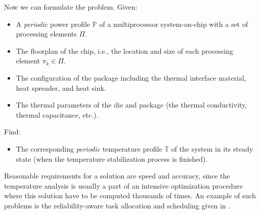 Now we can formulate the problem. Given:
\begin{itemize}
  \item A \emph{periodic} power profile $\mathbb{P}$ of a multiprocessor system-on-chip with a set of processing elements $\Pi$.
  \item The floorplan of the chip, i.e., the location and size of each processing element $\pi_k \in \Pi$.
  \item The configuration of the package including the thermal interface material, heat spreader, and heat sink.
  \item The thermal parameters of the die and package (the thermal conductivity, thermal capacitance, etc.).
\end{itemize}
Find:
\begin{itemize}
  \item The corresponding \emph{periodic} temperature profile $\mathbb{T}$ of the system in its steady state (when the temperature stabilization process is finished).
\end{itemize}

Reasonable requirements for a solution are speed and accuracy, since the temperature analysis is usually a part of an intensive optimization procedure where this solution have to be computed thousands of times. An example of such problems is the reliability-aware task allocation and scheduling given in .
